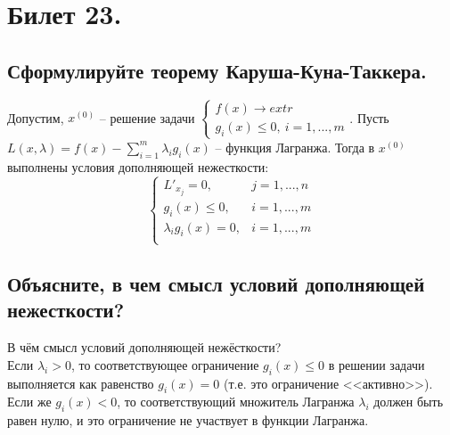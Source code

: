 \section{Билет 23.}

\subsection{Сформулируйте теорему Каруша-Куна-Таккера.}
\begin{theorem}
    Допустим, $x^{(0)}$ -- решение задачи $\begin{cases}
        f(x) \to extr \\
        g_i(x) \leqslant 0, \> i = 1,...,m
    \end{cases}$. Пусть $L(x, \lambda) = f(x) - \sum_{i=1}^{m} \lambda_i g_i(x)$ -- функция Лагранжа. Тогда в $x^{(0)}$ выполнены условия дополняющей нежесткости:
    \[
        \begin{cases}
            L'_{x_j} = 0, & j = 1, ..., n \\
            g_i(x) \leqslant 0, & i = 1, ..., m \\
            \lambda_i g_i(x) = 0, & i = 1, ..., m \\
        \end{cases}
    \]
\end{theorem}

\subsection{Объясните, в чем смысл условий дополняющей нежесткости?}
\begin{remark}
В чём смысл условий дополняющей нежёсткости?\\
Если $\lambda_i > 0$, то соответствующее ограничение $g_i(x) \leqslant 0$ в решении задачи выполняется как равенство $g_i(x) = 0$ (т.е. это ограничение <<активно>>).\\
Если же $g_i(x) < 0$, то соответствующий множитель Лагранжа $\lambda_i$ должен быть равен нулю, и это ограничение не участвует в функции Лагранжа.
\end{remark}